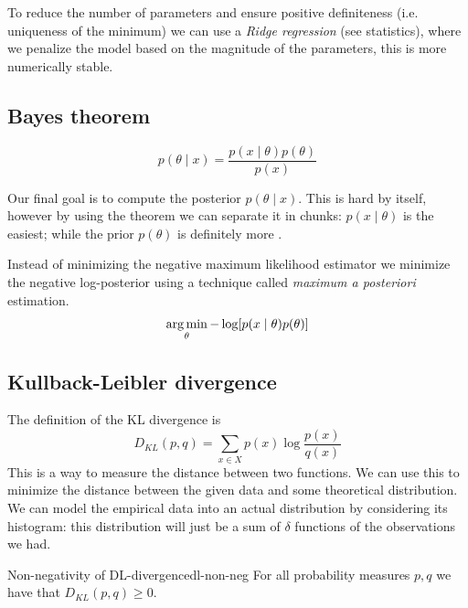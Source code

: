 \documentclass[12pt]{extarticle}
\begin{document}
To reduce the number of parameters and ensure positive definiteness (i.e. uniqueness of the minimum)
we can use a \emph{Ridge regression} (see statistics), where we penalize the model based on the
magnitude of the parameters, this is more numerically stable.

\subsection{Bayes theorem}

\begin{equation}
	p(\theta \mid x) = \frac{p(x\mid \theta) p(\theta)}{p(x)}
\end{equation}

Our final goal is to compute the posterior $p(\theta \mid x)$.
This is hard by itself, however by using the theorem we can separate it in 
chunks: $p(x \mid \theta)$ is the easiest; while the prior $p(\theta)$
is definitely more .

Instead of minimizing the negative maximum likelihood estimator
we minimize the negative log-posterior
using a technique called \emph{maximum a posteriori} estimation.
\begin{equation}
	\operatorname*{arg\,min}_\theta - \log [p(x \mid \theta) p(\theta)]
\end{equation}

\subsection{Kullback-Leibler divergence}

The definition of the KL divergence is
\begin{equation}
	D_{KL}(p,q) = \sum_{x \in X} p(x) \log \frac{p(x)}{q(x)}
\end{equation}
This is a way to measure the distance between two functions.
We can use this to minimize the distance between the given data and some theoretical distribution.
We can model the empirical data into an actual distribution by considering its histogram:
this distribution will just be a sum of $\delta$ functions of the observations we had.

\begin{proposition}{Non-negativity of DL-divergence}{dl-non-neg}
	For all probability measures $p, q$ we have that $D_{KL}(p, q) \geq 0$.
\end{proposition}
\end{document}
